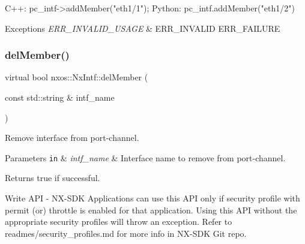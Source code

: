 \begin{DoxyCode}
C++:
   pc\_intf->addMember(\textcolor{stringliteral}{"eth1/1"});
Python:
   pc\_intf.addMember(\textcolor{stringliteral}{"eth1/2"})
\end{DoxyCode}



\begin{DoxyExceptions}{Exceptions}
{\em E\+R\+R\+\_\+\+I\+N\+V\+A\+L\+I\+D\+\_\+\+U\+S\+A\+GE} & E\+R\+R\+\_\+\+I\+N\+V\+A\+L\+ID E\+R\+R\+\_\+\+F\+A\+I\+L\+U\+RE \\
\hline
\end{DoxyExceptions}
\mbox{\label{classnxos_1_1_nx_intf_a6886f3b84e843069a5fdf5434b061f80}} 
\subsubsection{\texorpdfstring{del\+Member()}{delMember()}}
{\footnotesize\ttfamily virtual bool nxos\+::\+Nx\+Intf\+::del\+Member (\begin{DoxyParamCaption}\item[{const std\+::string \&}]{intf\+\_\+name }\end{DoxyParamCaption})\hspace{0.3cm}{\ttfamily [pure virtual]}}

Remove interface from port-\/channel. 
\begin{DoxyParams}[1]{Parameters}
\mbox{\tt in}  & {\em intf\+\_\+name} & Interface name to remove from port-\/channel. \\
\hline
\end{DoxyParams}
\begin{DoxyReturn}{Returns}
true if successful. ~\newline

\end{DoxyReturn}
\begin{DoxyVerb}Write API - NX-SDK Applications can use this API only if security profile with permit (or) throttle is 
            enabled for that application. Using this API without the appropriate security profiles will
            throw an exception. Refer to readmes/security_profiles.md for more info in NX-SDK Git repo.
\end{DoxyVerb}



